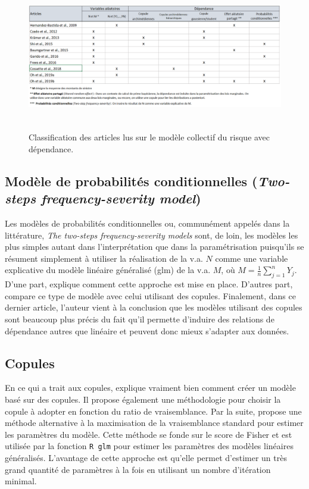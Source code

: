 \documentclass{article}
\begin{document}
	\begin{figure}[ht]
		\centering
		\includegraphics[height=6.5cm]{graph/Tableau_revue.PNG}
		\caption{Classification des articles lus sur le modèle collectif du risque avec dépendance.}
		\label{graph_revue_litterature}
	\end{figure}

	\subsection{Modèle de probabilités conditionnelles (\textit{Two-steps frequency-severity model})}
	Les modèles de probabilités conditionnelles ou, communément appelés dans la littérature, \textit{The two-steps frequency-severity models} sont, de loin, les modèles les plus simples autant dans l'interprétation que dans la paramétrisation puisqu'ils se résument simplement à utiliser la réalisation de la v.a. $N$ comme une variable explicative du modèle linéaire généralisé (glm) de la v.a. $M$, où $M=\frac{1}{n}\sum_{j=1}^{n} Y_j$. \\
	
	D'une part, \cite{garrido2016generalized} explique comment cette approche est mise en place. D'autres part, \cite{shi2015Dependant} compare ce type de modèle avec celui utilisant des copules. Finalement, dans ce dernier article, l'auteur vient à la conclusion que les modèles utilisant des copules sont beaucoup plus précis du fait qu'il permette d'induire des relations de dépendance autres que linéaire et peuvent donc mieux s'adapter aux données.

	\subsection{Copules}
	En ce qui a trait aux copules, \cite{kramer2013total} explique vraiment bien comment créer un modèle basé sur des copules. Il propose également une méthodologie pour choisir la copule à adopter en fonction du ratio de vraisemblance. Par la suite, \cite{czado2012mixed} propose une méthode alternative à la maximisation de la vraisemblance standard pour estimer les paramètres du modèle. Cette méthode se fonde sur le score de Fisher et est utilisée par la fonction \texttt{R glm} pour estimer les paramètres des modèles linéaires généralisés. L'avantage de cette approche est qu'elle permet d'estimer un très grand quantité de paramètres à la fois en utilisant un nombre d'itération minimal.\\
	
\end{document}
